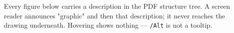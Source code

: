 \documentclass{latexally-assignment}
\begin{document}
\def\title{Described figures from the question bank}
\maketitle

\vspace{0.5em}
Every figure below carries a description in the PDF structure tree. A screen
reader announces "graphic" and then that description; it never reaches the
drawing underneath. Hovering shows nothing --- \texttt{/Alt} is not a tooltip.

\begin{qunlist}

  
  \newpage
  
  \newpage
  
  \newpage
  

\end{qunlist}
\end{document}
